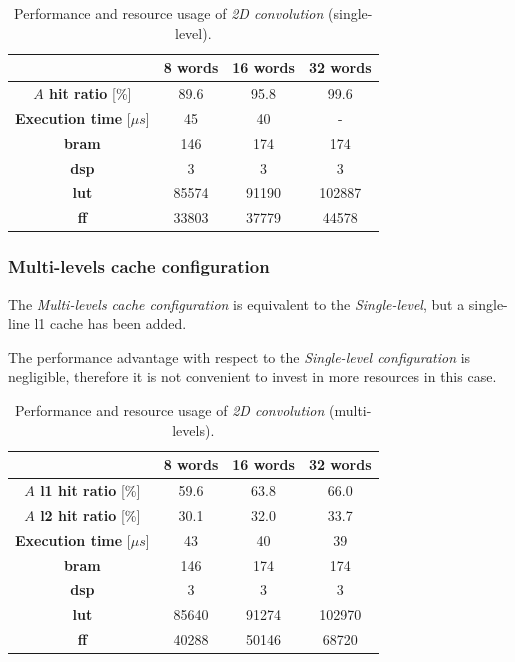 \documentclass[11pt,a4paper,oneside]{memoir}
\begin{document}
\begin{table}[H]
	\begin{center}
		\begin{tabular}{cccc}
			\hline
			\rowcolor{gray!50}
			& \textbf{8 words} & \textbf{16 words} & \textbf{32 words} \\
			\hline
			\textbf{$A$ hit ratio} [\%] & 89.6 & 95.8 & 99.6 \\
			\rowcolor{gray!25}
			\textbf{Execution time} [$\mu s$] & 45 & 40 & - \\
			\textbf{\ac{bram}} & 146 & 174 & 174 \\
			\rowcolor{gray!25}
			\textbf{\ac{dsp}} & 3 & 3 & 3 \\
			\textbf{\acs{lut}} & 85574 & 91190 & 102887 \\
			\rowcolor{gray!25}
			\textbf{\acs{ff}} & 33803 & 37779 & 44578 \\
			\hline
		\end{tabular}
	\end{center}
	\caption{Performance and resource usage of \emph{2D convolution}
	(single-level).}
	\label{tab:conv_no_l1_report}
\end{table}

\subsubsection{Multi-levels cache configuration}
The \emph{Multi-levels cache configuration} is equivalent to the
\emph{Single-level}, but a single-line \ac{l1} cache has been added.

The performance advantage with respect to the \emph{Single-level configuration}
is negligible, therefore it is not convenient to invest in more resources in
this case.

\begin{table}[H]
	\begin{center}
		\begin{tabular}{cccc}
			\hline
			\rowcolor{gray!50}
			& \textbf{8 words} & \textbf{16 words} & \textbf{32 words} \\
			\hline
			\textbf{$A$ \ac{l1} hit ratio} [\%] & 59.6 & 63.8 & 66.0 \\
			\rowcolor{gray!25}
			\textbf{$A$ \ac{l2} hit ratio} [\%] & 30.1 & 32.0 & 33.7 \\
			\textbf{Execution time} [$\mu s$] & 43 & 40 & 39 \\
			\rowcolor{gray!25}
			\textbf{\ac{bram}} & 146 & 174 & 174 \\
			\textbf{\ac{dsp}} & 3 & 3 & 3 \\
			\rowcolor{gray!25}
			\textbf{\acs{lut}} & 85640 & 91274 & 102970 \\
			\textbf{\acs{ff}} & 40288 & 50146 & 68720 \\
			\hline
		\end{tabular}
	\end{center}
	\caption{Performance and resource usage of \emph{2D convolution}
	(multi-levels).}
	\label{tab:conv_l1_report}
\end{table}
\end{document}
